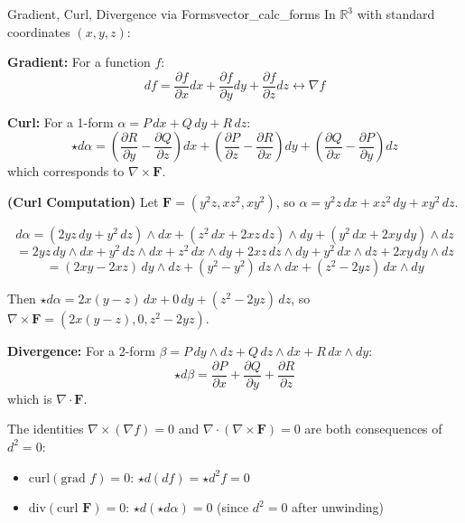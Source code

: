 \documentclass[11pt, letterpaper, openany]{book}
\begin{document}
\begin{thm}{Gradient, Curl, Divergence via Forms}{vector_calc_forms}
In $\mathbb{R}^3$ with standard coordinates $(x, y, z)$:

\textbf{Gradient:} For a function $f$:
\[df = \frac{\partial f}{\partial x}dx + \frac{\partial f}{\partial y}dy + \frac{\partial f}{\partial z}dz \longleftrightarrow \nabla f\]

\textbf{Curl:} For a 1-form $\alpha = P\,dx + Q\,dy + R\,dz$:
\[\star d\alpha = \left(\frac{\partial R}{\partial y} - \frac{\partial Q}{\partial z}\right)dx + \left(\frac{\partial P}{\partial z} - \frac{\partial R}{\partial x}\right)dy + \left(\frac{\partial Q}{\partial x} - \frac{\partial P}{\partial y}\right)dz\]
which corresponds to $\nabla \times \mathbf{F}$.

\begin{example}
\textbf{(Curl Computation)}
Let $\mathbf{F} = (y^2 z, xz^2, xy^2)$, so $\alpha = y^2 z\,dx + xz^2\,dy + xy^2\,dz$.

\[d\alpha = (2yz\,dy + y^2\,dz) \wedge dx + (z^2\,dx + 2xz\,dz) \wedge dy + (y^2\,dx + 2xy\,dy) \wedge dz\]
\[= 2yz\,dy \wedge dx + y^2\,dz \wedge dx + z^2\,dx \wedge dy + 2xz\,dz \wedge dy + y^2\,dx \wedge dz + 2xy\,dy \wedge dz\]
\[= (2xy - 2xz)\,dy \wedge dz + (y^2 - y^2)\,dz \wedge dx + (z^2 - 2yz)\,dx \wedge dy\]

Then $\star d\alpha = 2x(y-z)\,dx + 0\,dy + (z^2 - 2yz)\,dz$, so $\nabla \times \mathbf{F} = (2x(y-z), 0, z^2 - 2yz)$.
\end{example}

\textbf{Divergence:} For a 2-form $\beta = P\,dy \wedge dz + Q\,dz \wedge dx + R\,dx \wedge dy$:
\[\star d\beta = \frac{\partial P}{\partial x} + \frac{\partial Q}{\partial y} + \frac{\partial R}{\partial z}\]
which is $\nabla \cdot \mathbf{F}$.
\end{thm}

\begin{remark}
The identities $\nabla \times (\nabla f) = 0$ and $\nabla \cdot (\nabla \times \mathbf{F}) = 0$ are both consequences of $d^2 = 0$:
\begin{itemize}
    \item $\text{curl}(\text{grad } f) = 0$: $\star d(df) = \star d^2 f = 0$
    \item $\text{div}(\text{curl } \mathbf{F}) = 0$: $\star d(\star d\alpha) = 0$ (since $d^2 = 0$ after unwinding)
\end{itemize}
\end{remark}
\end{document}
